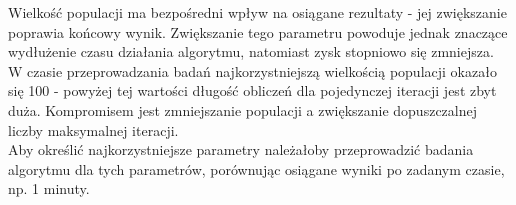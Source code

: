 Wielkość populacji ma bezpośredni wpływ na osiągane rezultaty - jej zwiększanie poprawia końcowy wynik. Zwiększanie tego parametru powoduje jednak znaczące wydłużenie czasu działania algorytmu, natomiast zysk stopniowo się zmniejsza. W czasie przeprowadzania badań najkorzystniejszą wielkością populacji okazało się 100 - powyżej tej wartości długość obliczeń dla pojedynczej iteracji jest zbyt duża. Kompromisem jest  zmniejszanie populacji a zwiększanie dopuszczalnej liczby maksymalnej iteracji. \\
Aby określić najkorzystniejsze parametry należałoby przeprowadzić badania algorytmu dla tych parametrów, porównując osiągane wyniki po zadanym czasie, np. 1 minuty.
